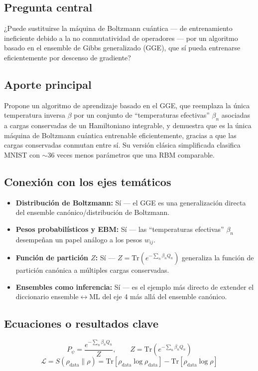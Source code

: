 \documentclass[12pt]{article}
\begin{document}
\subsection*{Pregunta central}
¿Puede sustituirse la máquina de Boltzmann cuántica --- de entrenamiento ineficiente debido a
la no conmutatividad de operadores --- por un algoritmo basado en el ensemble de Gibbs
generalizado (GGE), que sí pueda entrenarse eficientemente por descenso de gradiente?

\subsection*{Aporte principal}
Propone un algoritmo de aprendizaje basado en el GGE, que reemplaza la única temperatura
inversa $\beta$ por un conjunto de ``temperaturas efectivas'' $\beta_n$ asociadas a cargas
conservadas de un Hamiltoniano integrable, y demuestra que es la única máquina de Boltzmann
cuántica entrenable eficientemente, gracias a que las cargas conservadas conmutan entre sí. Su
versión clásica simplificada clasifica MNIST con $\sim$36 veces menos parámetros que una RBM
comparable.

\subsection*{Conexión con los ejes temáticos}
\begin{itemize}
  \item \textbf{Distribución de Boltzmann:} Sí --- el GGE es una generalización directa del ensemble canónico/distribución de Boltzmann.
  \item \textbf{Pesos probabilísticos y EBM:} Sí --- las ``temperaturas efectivas'' $\beta_n$ desempeñan un papel análogo a los pesos $w_{ij}$.
  \item \textbf{Función de partición $Z$:} Sí --- $Z=\mathrm{Tr}(e^{-\sum_n \beta_n Q_n})$ generaliza la función de partición canónica a múltiples cargas conservadas.
  \item \textbf{Ensembles como inferencia:} Sí --- es el ejemplo más directo de extender el diccionario ensemble$\leftrightarrow$ML del eje 4 más allá del ensemble canónico.
\end{itemize}

\subsection*{Ecuaciones o resultados clave}
\begin{equation}
P_\psi = \frac{e^{-\sum_n \beta_n Q_n}}{Z}, \qquad Z = \mathrm{Tr}\!\left(e^{-\sum_n \beta_n Q_n}\right)
\end{equation}
\begin{equation}
\mathcal{L} = S(\rho_{\text{data}}\|\rho) = \mathrm{Tr}[\rho_{\text{data}}\log\rho_{\text{data}}] - \mathrm{Tr}[\rho_{\text{data}}\log\rho]
\end{equation}
\end{document}
